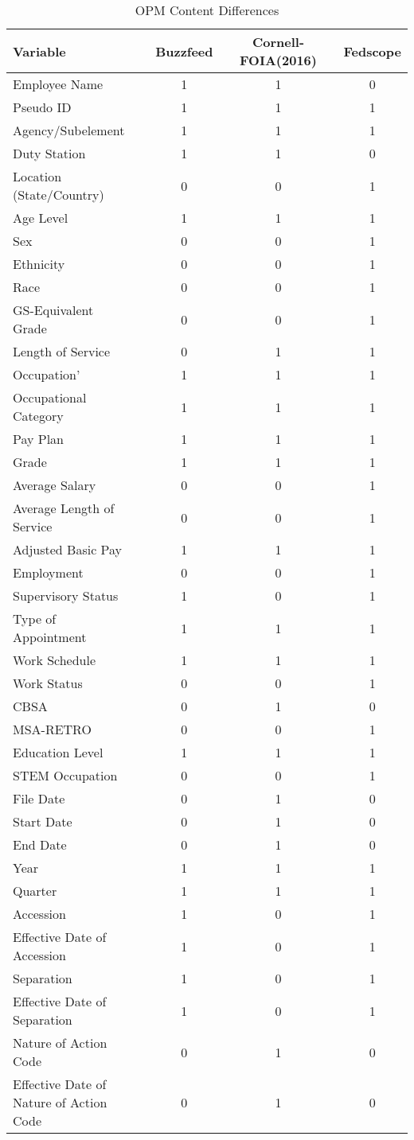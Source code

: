 \documentclass{article}
\begin{document}
\begin{table}[htbp]
	\centering
	\caption{OPM Content Differences}
	\begin{tabular}{l|rccccc}
		Variable 	&& Buzzfeed && Cornell-FOIA(2016) && Fedscope \\ \hline\hline
		Employee Name&&1&&1&&0\\
		Pseudo ID&&1&&1&&1\\
		Agency/Subelement&&1&&1&&1\\
		Duty Station&&1&&1&&0\\
		Location (State/Country)&&0&&0&&1\\
		Age Level&&1&&1&&1\\
		Sex &&0&&0&&1\\
		Ethnicity&&0&&0&&1\\
		Race&&0&&0&&1\\
		GS-Equivalent Grade&&0&&0&&1\\
		Length of Service&&0&&1&&1\\
		Occupation'&&1&&1&&1\\
		Occupational Category&&1&&1&&1\\
		Pay Plan &&1&&1&&1\\
		Grade&&1&&1&&1\\
		Average Salary&&0&&0&&1\\
		Average Length of Service&&0&&0&&1\\
		Adjusted Basic Pay&&1&&1&&1\\
		Employment&&0&&0&&1\\
		Supervisory Status&&1&&0&&1\\
		Type of Appointment&&1&&1&&1\\
		Work Schedule&&1&&1&&1\\
		Work Status&&0&&0&&1\\
		CBSA&&0&&1&&0\\
		MSA-RETRO&&0&&0&&1\\
		Education Level&&1&&1&&1\\
		STEM Occupation&&0&&0&&1\\
		File Date&&0&&1&&0\\
		Start Date&&0&&1&&0\\
		End Date&&0&&1&&0\\
		Year&&1&&1&&1\\
		Quarter&&1&&1&&1\\
		Accession&&1&&0&&1\\
		Effective Date of Accession&&1&&0&&1\\
		Separation&&1&&0&&1\\
		Effective Date of Separation&&1&&0&&1\\
		Nature of Action Code&&0&&1&&0\\
		Effective Date of Nature of Action Code&&0&&1&&0\\
	\end{tabular}
\end{table}
\end{document}
